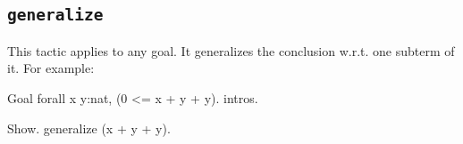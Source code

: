 %
%

\subsection{\tt generalize \term}
\label{generalize}

This tactic applies to any goal. It generalizes the conclusion w.r.t.
one subterm of it. For example:

\begin{coq_eval}
Goal forall x y:nat, (0 <= x + y + y).
intros.
\end{coq_eval}
\begin{coq_example}
Show.
generalize (x + y + y).
\end{coq_example}

